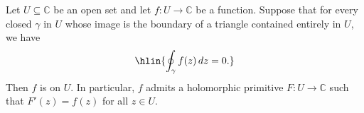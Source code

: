 \begin{theorem} \label{theorem:moreras_theorem_stating_complex_valued_functions_on_an_open_subset_of_the_complex_plane_whose_contour_integrals_on_triangles_in_the_domain_vanish_are_holomorphic}
Let $U \subseteq \mathbb{C}$ be an open set and let $f : U \to \mathbb{C}$ be a  function. Suppose that for every closed  $\gamma$ in $U$ whose image is the boundary of a triangle contained entirely in $U$, we have
$$\hlin{\oint_{\gamma} f(z)\,dz = 0.}$$
Then $f$ is  on $U$. In particular, $f$ admits a holomorphic primitive $F : U \to \mathbb{C}$ such that $F'(z) = f(z)$ for all $z \in U$.
\end{theorem}

